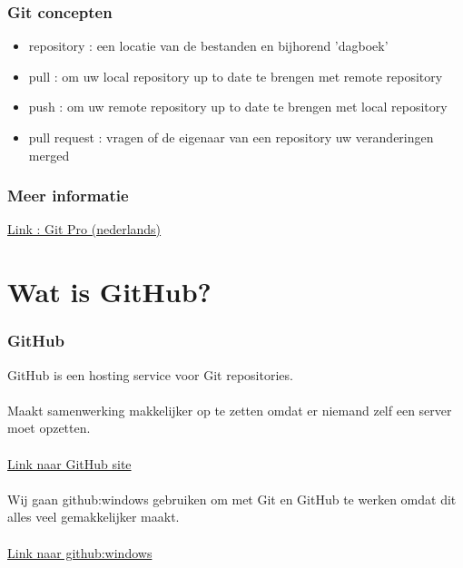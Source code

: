 \documentclass{beamer}
\begin{document}
\begin{frame}

\frametitle{Git concepten}

{\LARGE \begin{itemize}
\item repository : een locatie van de bestanden en bijhorend 'dagboek'
\item pull : om uw local repository up to date te brengen met remote repository
\item push : om uw remote repository up to date te brengen met local repository
\item pull request : vragen of de eigenaar van een repository uw veranderingen merged
\end{itemize}}

\end{frame}


\begin{frame}

\frametitle{Meer informatie}

{\huge \href{http://git-scm.com/book/nl}{Link : Git Pro (nederlands)}}

\end{frame}


\section{Wat is GitHub?}


\begin{frame}

\frametitle{GitHub}

{\Large GitHub is een hosting service voor Git repositories.\\~\\

Maakt samenwerking makkelijker op te zetten omdat er niemand
zelf een server moet opzetten.\\~\\

\href{https://github.com/}{Link naar GitHub site}\\~\\

Wij gaan github:windows gebruiken om met Git en GitHub te werken omdat dit
alles veel gemakkelijker maakt.\\~\\

\href{http://windows.github.com/}{Link naar github:windows} }

\end{frame}
\end{document}
